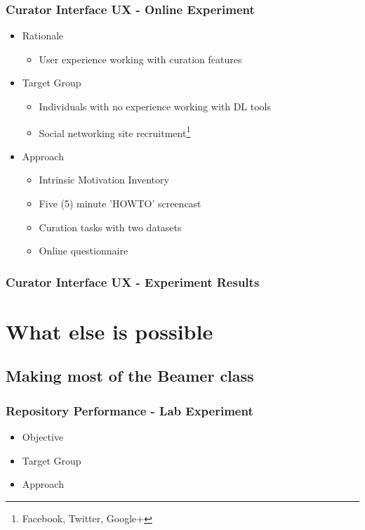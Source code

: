 \documentclass[xcolor=pdftex,t,11pt]{beamer}
\begin{document}
\begin{frame}[fragile]
\frametitle{Curator Interface UX - Online Experiment}
\begin{itemize}
\item Rationale
\begin{itemize}
\item User experience working with curation features
\end{itemize}
\item Target Group
\begin{itemize}
\item Individuals with no experience working with DL tools
\item Social networking site recruitment\footnote{\tiny Facebook, Twitter,
Google$+$}
\end{itemize}
\item Approach
\begin{itemize}
\item Intrinsic Motivation Inventory
\item Five (5) minute 'HOWTO' screencast
\item Curation tasks with two datasets
\item Online questionnaire
\end{itemize}
\end{itemize}
\end{frame}


\begin{frame}[fragile]
\frametitle{Curator Interface UX - Experiment Results}
\centering

\end{frame}


\section{What else is possible}


\subsection{Making most of the Beamer class}

\begin{frame}[fragile]
\frametitle{Repository Performance - Lab Experiment}
\begin{itemize}
\item Objective
\item Target Group
\item Approach
\end{itemize}
\end{frame}
\end{document}
